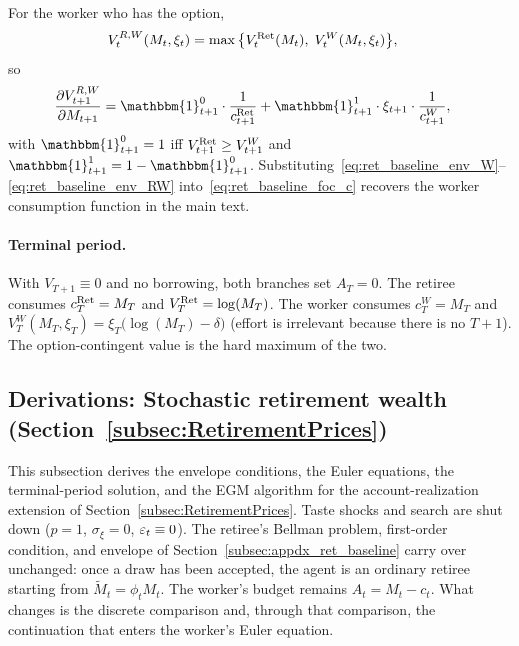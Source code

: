 For the worker who has the option,
\begin{align}
	V_t^{R,W}(M_t,\xi_t)
	&= \max\big\{V_t^{\mathrm{Ret}}(M_t),\; V_t^{W}(M_t,\xi_t)\big\},
\end{align}
so
\begin{align}
	\frac{\partial V_{t+1}^{R,W}}{\partial M_{t+1}}
	&= \mathbbm{1}_{t+1}^{0}\cdot\frac{1}{c_{t+1}^{\Ret}}
	+\mathbbm{1}_{t+1}^{1}\cdot\xi_{t+1}\cdot\frac{1}{c_{t+1}^{W}},
	\label{eq:ret_baseline_env_RW}
\end{align}
with $\mathbbm{1}_{t+1}^{0}=1$ iff $V_{t+1}^{\mathrm{Ret}}\ge V_{t+1}^{W}$ and $\mathbbm{1}_{t+1}^{1}=1-\mathbbm{1}_{t+1}^{0}$. Substituting~\eqref{eq:ret_baseline_env_W}--\eqref{eq:ret_baseline_env_RW} into~\eqref{eq:ret_baseline_foc_c} recovers the worker consumption function in the main text.

\paragraph{Terminal period.}
With $V_{T+1}\equiv 0$ and no borrowing, both branches set $A_T=0$. The retiree consumes $c_T^{\mathrm{Ret}}=M_T$ and $V_T^{\mathrm{Ret}}=\log(M_T)$. The worker consumes $c_T^{W}=M_T$ and $V_T^{W}(M_T,\xi_T)=\xi_T\bigl(\log(M_T)-\delta\bigr)$ (effort is irrelevant because there is no $T+1$). The option-contingent value is the hard maximum of the two.

\subsection{Derivations: Stochastic retirement wealth (Section~\ref{subsec:RetirementPrices})}\label{subsec:appdx_ret_price}
This subsection derives the envelope conditions, the Euler equations, the terminal-period solution, and the EGM algorithm for the account-realization extension of Section~\ref{subsec:RetirementPrices}. Taste shocks and search are shut down ($p=1$, $\sigma_\xi=0$, $\varepsilon_t\equiv 0$). The retiree's Bellman problem, first-order condition, and envelope of Section~\ref{subsec:appdx_ret_baseline} carry over unchanged: once a draw has been accepted, the agent is an ordinary retiree starting from $\tilde M_t=\phi_t M_t$. The worker's budget remains $A_t=M_t-c_t$. What changes is the discrete comparison and, through that comparison, the continuation that enters the worker's Euler equation.

